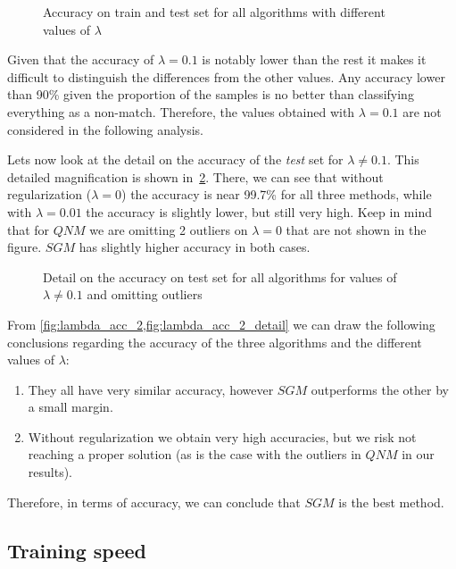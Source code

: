\begin{figure}[H]
    
    \caption{Accuracy on train and test set for all algorithms with different values of $\lambda$}
    \label{fig:lambda_acc_2}
\end{figure}

Given that the accuracy of $\lambda=0.1$ is notably lower than the rest it
makes it difficult to distinguish the differences from the other values.
Any accuracy lower than 90\% given the proportion of the samples is no better
than classifying everything as a non-match. Therefore, the values obtained
with $\lambda=0.1$ are not considered in the following analysis.

Lets now look at the detail on the accuracy of the \emph{test} set for
$\lambda \neq 0.1$. This detailed magnification is shown in~\cref{fig:lambda_acc_2_detail}.
There, we can see that without regularization ($\lambda = 0$) the accuracy is
near 99.7\% for all three methods, while with $\lambda = 0.01$ the accuracy is slightly
lower, but still very high. Keep in mind that for $QNM$ we are omitting 2 outliers on
$\lambda = 0$ that are not shown in the figure. $SGM$ has slightly higher accuracy in
both cases.

\begin{figure}[H]
    
    \caption{Detail on the accuracy on test set for all algorithms for values of $\lambda \neq 0.1$ and
    omitting outliers}
    \label{fig:lambda_acc_2_detail}
\end{figure}

From \cref{fig:lambda_acc_2,fig:lambda_acc_2_detail} we can draw the following conclusions regarding
the accuracy of the three algorithms and the different values of $\lambda$:
\begin{enumerate}
    \item They all have very similar accuracy, however $SGM$ outperforms the other by a
        small margin.
    \item Without regularization we obtain very high accuracies, but we risk not reaching
        a proper solution (as is the case with the outliers in $QNM$ in our results).
\end{enumerate}

Therefore, in terms of accuracy, we can conclude that $SGM$ is the best method.

\pagebreak
\subsection{Training speed}

